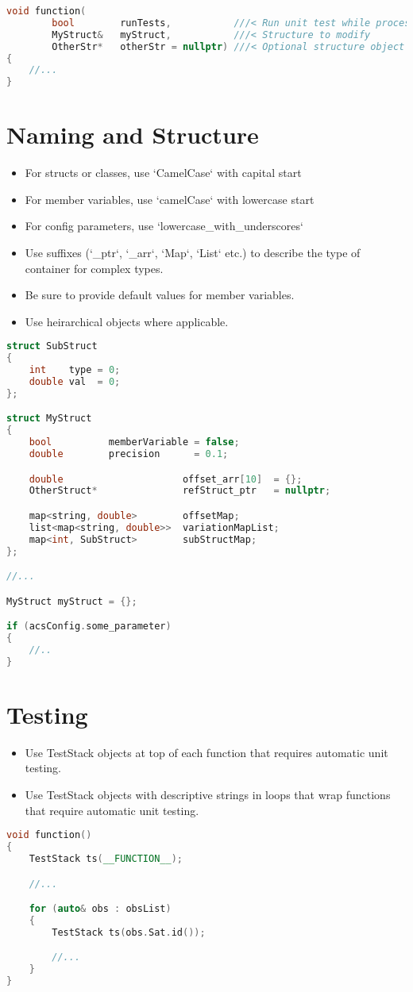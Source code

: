 \begin{lstlisting}[language=c++]
void function(
        bool        runTests,           ///< Run unit test while processing
        MyStruct&   myStruct,           ///< Structure to modify
        OtherStr*	otherStr = nullptr)	///< Optional structure object to populate (cant use reference because its optional)
{
   	//...
}
\end{lstlisting}

\section{Naming and Structure}
%
\begin{itemize}
\item For structs or classes, use `CamelCase` with capital start
\item For member variables, use `camelCase` with lowercase start
\item For config parameters, use `lowercase\_with\_underscores`
\item Use suffixes (`\_ptr`, `\_arr`, `Map`, `List` etc.) to describe the type of container for complex types.
\item Be sure to provide default values for member variables.
\item Use heirarchical objects where applicable.
\end{itemize}
%
\begin{lstlisting}[language=c++]
struct SubStruct
{
    int    type = 0;
    double val  = 0;
};

struct MyStruct
{
    bool          memberVariable = false;
    double        precision      = 0.1;

    double                     offset_arr[10]  = {};
    OtherStruct*               refStruct_ptr   = nullptr;

    map<string, double>        offsetMap; 
    list<map<string, double>>  variationMapList;
    map<int, SubStruct>        subStructMap;
};

//...

MyStruct myStruct = {};

if (acsConfig.some_parameter)
{
    //..
}
\end{lstlisting}
\section{Testing}
\begin{itemize}
	\item Use TestStack objects at top of each function that requires automatic unit testing.
	\item Use TestStack objects with descriptive strings in loops that wrap functions that require automatic unit testing.
\end{itemize}
\begin{lstlisting}[language=c++]
void function()
{
    TestStack ts(__FUNCTION__);

    //...

    for (auto& obs : obsList)
    {
        TestStack ts(obs.Sat.id());

        //...
    }
}
\end{lstlisting}
